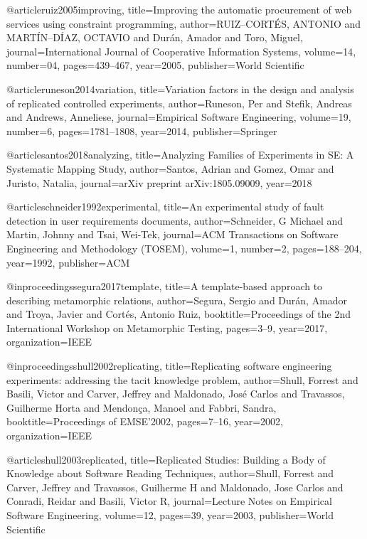 @article{ruiz2005improving,
  title={Improving the automatic procurement of web services using constraint programming},
  author={RUIZ--CORT{\'E}S, ANTONIO and MART{\'I}N--D{\'I}AZ, OCTAVIO and Dur{\'a}n, Amador and Toro, Miguel},
  journal={International Journal of Cooperative Information Systems},
  volume={14},
  number={04},
  pages={439--467},
  year={2005},
  publisher={World Scientific}
}

@article{runeson2014variation,
  title={Variation factors in the design and analysis of replicated controlled experiments},
  author={Runeson, Per and Stefik, Andreas and Andrews, Anneliese},
  journal={Empirical Software Engineering},
  volume={19},
  number={6},
  pages={1781--1808},
  year={2014},
  publisher={Springer}
}

@article{santos2018analyzing,
  title={Analyzing Families of Experiments in SE: A Systematic Mapping Study},
  author={Santos, Adrian and Gomez, Omar and Juristo, Natalia},
  journal={arXiv preprint arXiv:1805.09009},
  year={2018}
}


@article{schneider1992experimental,
  title={An experimental study of fault detection in user requirements documents},
  author={Schneider, G Michael and Martin, Johnny and Tsai, Wei-Tek},
  journal={ACM Transactions on Software Engineering and Methodology (TOSEM)},
  volume={1},
  number={2},
  pages={188--204},
  year={1992},
  publisher={ACM}
}

@inproceedings{segura2017template,
  title={A template-based approach to describing metamorphic relations},
  author={Segura, Sergio and Dur{\'a}n, Amador and Troya, Javier and Cort{\'e}s, Antonio Ruiz},
  booktitle={Proceedings of the 2nd International Workshop on Metamorphic Testing},
  pages={3--9},
  year={2017},
  organization={IEEE}
}


@inproceedings{shull2002replicating,
  title={Replicating software engineering experiments: addressing the tacit knowledge problem},
  author={Shull, Forrest and Basili, Victor and Carver, Jeffrey and Maldonado, Jos{\'e} Carlos and Travassos, Guilherme Horta and Mendon{\c{c}}a, Manoel and Fabbri, Sandra},
  booktitle={Proceedings of EMSE'2002},
  pages={7--16},
  year={2002},
  organization={IEEE}
}

 
@article{shull2003replicated,
  title={Replicated Studies: Building a Body of Knowledge about Software Reading Techniques},
  author={Shull, Forrest and Carver, Jeffrey and Travassos, Guilherme H and Maldonado, Jose Carlos and Conradi, Reidar and Basili, Victor R},
  journal={Lecture Notes on Empirical Software Engineering},
  volume={12},
  pages={39},
  year={2003},
  publisher={World Scientific}
}

